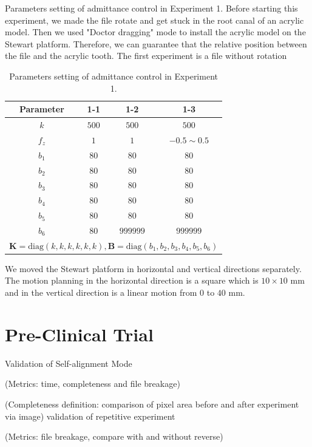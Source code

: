 Parameters setting of admittance control in Experiment 1. Before starting this experiment, we made the file rotate and get stuck in the root canal of an acrylic model. Then we used "Doctor dragging" mode to install the acrylic model on the Stewart platform. Therefore, we can guarantee that the relative position between the file and the acrylic tooth. The first experiment is a file without rotation 
\par
\begin{table}[htbp]
\centering
\caption{Parameters setting of admittance control in Experiment 1.}
\label{tab: para_adm_exp1}
\begin{tabular}{cccc} 
\hline \hline
Parameter	&1-1		&1-2		&1-3	\\
\hline
$k$			&$500$		&$500$		&$500$				\\
$f_z$		&$1$		&$1$		&$-0.5 \sim 0.5$	\\
$b_1$		&$80$		&$80$		&$80$				\\
$b_2$		&$80$		&$80$		&$80$				\\
$b_3$		&$80$		&$80$		&$80$				\\
$b_4$		&$80$		&$80$		&$80$				\\
$b_5$		&$80$		&$80$		&$80$				\\
$b_6$		&$80$		&$999999$	&$999999$			\\
\hline	
\multicolumn{4}{*}{$\mathbf{K} = \text{diag}(k,k,k,k,k,k),\mathbf{B} = \text{diag}(b_1,b_2,b_3,b_4,b_5,b_6)$}\\
\hline\hline	
\end{tabular}
\end{table}
We moved the Stewart platform in horizontal and vertical directions separately. The motion planning in the horizontal direction is a square which is $10\times 10$ mm and in the vertical direction is a linear motion from $0$ to $40$ mm.
\section{Pre-Clinical Trial}
Validation of Self-alignment Mode
\par\noindent
(Metrics: time, completeness and file breakage)								
\par\noindent
(Completeness definition: comparison of pixel area before and after experiment via image)
validation of repetitive experiment
\par\noindent
(Metrics: file breakage, compare with and without reverse)